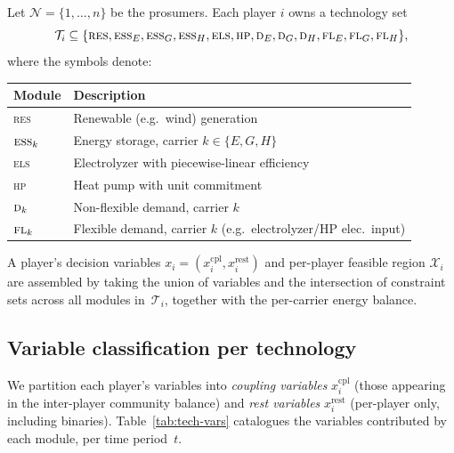 \documentclass[11pt]{article}
\theoremstyle{definition}
\newcommand{\N}{\mathcal{N}}
\newcommand{\xcom}{x^{\mathrm{cpl}}}
\newcommand{\xrest}{x^{\mathrm{rest}}}
\newcommand{\feas}{\mathcal{X}}
\newcommand{\Tech}{\mathcal{T}}
\begin{document}
Let $\N=\{1,\dots,n\}$ be the prosumers.  Each player $i$ owns a
technology set
\[
\Tech_i\subseteq
\{\textsc{res},\textsc{ess}_E,\textsc{ess}_G,\textsc{ess}_H,
  \textsc{els},\textsc{hp},
  \textsc{d}_E,\textsc{d}_G,\textsc{d}_H,
  \textsc{fl}_E,\textsc{fl}_G,\textsc{fl}_H\},
\]
where the symbols denote:
\begin{center}\small
\begin{tabular}{@{}ll@{}}
\toprule
Module & Description\\
\midrule
\textsc{res} & Renewable (e.g.\ wind) generation \\
$\textsc{ess}_k$ & Energy storage, carrier $k\in\{E,G,H\}$\\
\textsc{els} & Electrolyzer with piecewise-linear efficiency \\
\textsc{hp} & Heat pump with unit commitment \\
$\textsc{d}_k$ & Non-flexible demand, carrier $k$\\
$\textsc{fl}_k$ & Flexible demand, carrier $k$ (e.g.\ electrolyzer/HP elec.\ input)\\
\bottomrule
\end{tabular}
\end{center}
A player's decision variables $x_i=(\xcom_i,\xrest_i)$ and
per-player feasible region $\feas_i$ are assembled by taking the union
of variables and the intersection of constraint sets across all modules
in~$\Tech_i$, together with the per-carrier energy balance.

\subsection{Variable classification per technology}
\label{sec:vars}

We partition each player's variables into \emph{coupling variables}
$\xcom_i$ (those appearing in the inter-player community balance) and
\emph{rest variables} $\xrest_i$ (per-player only, including binaries).
Table~\ref{tab:tech-vars} catalogues the variables contributed by each
module, per time period~$t$.
\end{document}
